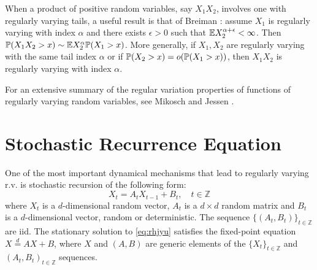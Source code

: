 When a product of positive random variables, say $X_1 X_2$, involves
one with regularly varying tails, a useful result is that of
Breiman \cite{breiman:1965}: assume $X_1$ is regularly varying with
index $\alpha$ and there exists $\epsilon > 0$ such that
$\E X_2^{\alpha + \epsilon} < \infty$.
Then $\P(X_1 X_2 > x) \sim \E X_2^{\alpha} \P(X_1 > x)$.
More generally, if $X_1, X_2$ are regularly varying with the same tail
index $\alpha$ or if $\P(X_2 > x) = o(\P(X_1 > x))$, then $X_1 X_2$ is
regularly varying with index $\alpha$.

For an extensive summary of the regular variation properties of
functions of regularly varying random variables, see Mikosch and
Jessen \cite{JessenMikosch2006}.


\section{Stochastic Recurrence Equation}
One of the most important dynamical mechanisms that lead to regularly
varying r.v. is stochastic recursion of the following form:
\begin{equation}
  \label{eq:rhjyu}
  X_t = A_t X_{t-1} + B_t, \quad t \in \mathbb Z
\end{equation}
where $X_t$ is a $d$-dimensional random vector, $A_t$ is a $d\times d$
random matrix and $B_t$ is a $d$-dimensional vector, random or
deterministic. The sequence $\{(A_t, B_t)\}_{t \in \mathbb Z}$ are
iid. The stationary solution to \eqref{eq:rhjyu} satisfies the fixed-point
equation $X \overset{d}{=} A X + B$, where $X$ and $(A, B)$ are
generic elements of the $\{X_t\}_{t \in \mathbb Z}$ and
$(A_t, B_t)_{t \in \mathbb Z}$ sequences.

